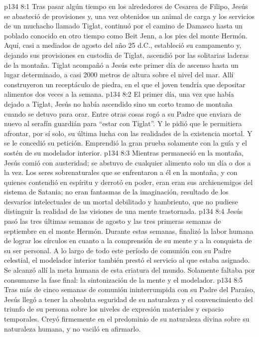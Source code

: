 \vs p134 8:1 Tras pasar algún tiempo en los alrededores de Cesarea de Filipo, Jesús se abasteció de provisiones y, una vez obtenidos un animal de carga y los servicios de un muchacho llamado Tiglat, continuó por el camino de Damasco hasta un poblado conocido en otro tiempo como Beit Jenn, a los pies del monte Hermón. Aquí, casi a mediados de agosto del año 25 d.C., estableció su campamento y, dejando sus provisiones en custodia de Tiglat, ascendió por las solitarias laderas de la montaña. Tiglat acompañó a Jesús este primer día de ascenso hasta un lugar determinado, a casi 2000 metros de altura sobre el nivel del mar. Allí construyeron un receptáculo de piedra, en el que el joven tendría que depositar alimentos dos veces a la semana.
\vs p134 8:2 El primer día, una vez que había dejado a Tiglat, Jesús no había ascendido sino un corto tramo de montaña cuando se detuvo para orar. Entre otras cosas rogó a su Padre que enviara de nuevo al serafín guardián para “estar con Tiglat”. Y le pidió que le permitiera afrontar, por sí solo, su última lucha con las realidades de la existencia mortal. Y se le concedió su petición. Emprendió la gran prueba solamente con la guía y el sostén de su modelador interior.
\vs p134 8:3 \pc Mientras permaneció en la montaña, Jesús comió con austeridad; se abstuvo de cualquier alimento solo un día o dos a la vez. Los seres sobrenaturales que se enfrentaron a él en la montaña, y con quienes contendió en espíritu y derrotó en poder, eran  eran sus archienemigos del sistema de Satania; no eran fantasmas de la imaginación, resultado de los desvaríos intelectuales de un mortal debilitado y hambriento, que no pudiese distinguir la realidad de las visiones de una mente trastornada.
\vs p134 8:4 Jesús pasó las tres últimas semanas de agosto y las tres primeras semanas de septiembre en el monte Hermón. Durante estas semanas, finalizó la labor humana de lograr los círculos en cuanto a la comprensión de su mente y a la conquista de su ser personal. A lo largo de todo este período de comunión con su Padre celestial, el modelador interior también prestó el servicio al que estaba asignado. Se alcanzó allí la meta humana de esta criatura del mundo. Solamente faltaba por consumarse la fase final: la sintonización de la mente y el modelador.
\vs p134 8:5 Tras más de cinco semanas de comunión ininterrumpida con su Padre del Paraíso, Jesús llegó a tener la absoluta seguridad de su naturaleza y el convencimiento del triunfo de su persona sobre los niveles de expresión materiales y espacio temporales. Creyó firmemente en el predominio de su naturaleza divina sobre su naturaleza humana, y no vaciló en afirmarlo.

